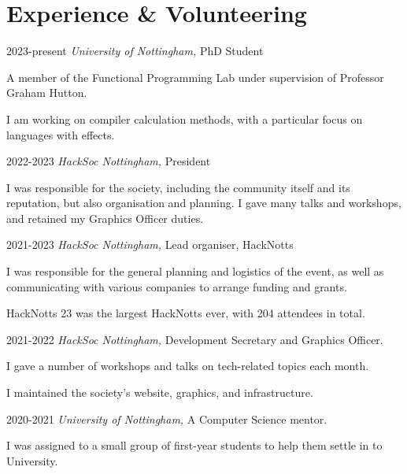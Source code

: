 \documentclass[12pt]{article}
\begin{document}
\section*{Experience \& Volunteering}

\begin{explist}
	\item[2023-present] \textit{University of Nottingham,} PhD Student
	{\small \begin{explist}
		\item A member of the Functional Programming Lab under supervision of Professor Graham Hutton.
		\item I am working on compiler calculation methods, with a particular focus on languages with effects.
	\end{explist}}
	\item[2022-2023] \textit{HackSoc Nottingham,} President
	{\small \begin{explist}
		\item I was responsible for the society, including the community itself and its reputation, but also organisation and planning. I gave many talks and workshops, and retained my Graphics Officer duties.
	\end{explist}}
	\item[2021-2023] \textit{HackSoc Nottingham,} Lead organiser, HackNotts
	{\small \begin{explist}
		\item I was responsible for the general planning and logistics of the event, as well as communicating with various companies to arrange funding and grants.
		\item HackNotts 23 was the largest HackNotts ever, with 204 attendees in total.
	\end{explist}}
	\item[2021-2022] \textit{HackSoc Nottingham,} Development Secretary and Graphics Officer.
	{\small \begin{explist}
		\item I gave a number of workshops and talks on tech-related topics each month.
		\item I maintained the society's website, graphics, and infrastructure.
	\end{explist}}
	\item[2020-2021] \textit{University of Nottingham,} A Computer Science mentor.
	{\small \begin{explist}
		\item I was assigned to a small group of first-year students to help them settle in to University.

\end{explist}}
\end{explist}
\end{document}
